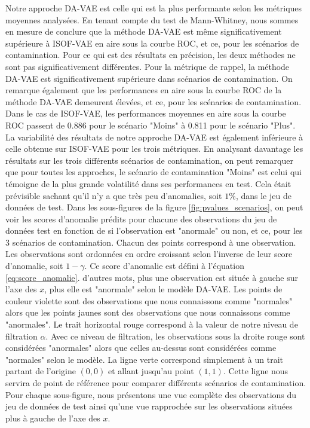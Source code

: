 Notre approche DA-VAE est celle qui est la plus performante selon les métriques moyennes analysées. En tenant compte du test de Mann-Whitney, nous sommes en mesure de conclure que la méthode DA-VAE est même significativement supérieure à ISOF-VAE en aire sous la courbe ROC, et ce, pour les \DIFdelbegin {}\DIFdelend \DIFaddbegin {}\DIFaddend scénarios de contamination. Pour ce qui est des résultats en précision, les deux méthodes ne sont pas significativement différentes. Pour la métrique de rappel, la méthode DA-VAE est significativement supérieure dans \DIFdelbegin {}\DIFdelend \DIFaddbegin {}\DIFaddend scénarios de contamination. On remarque également  que les performances en aire sous la courbe ROC de la méthode DA-VAE demeurent élevées, et ce, pour les \DIFdelbegin {}\DIFdelend \DIFaddbegin {}\DIFaddend scénarios de contamination. Dans le cas de ISOF-VAE, les performances moyennes en aire sous la courbe ROC passent de 0.886 pour le scénario "Moins" à 0.811 pour le scénario "Plus". La variabilité des résultats de notre approche DA-VAE est également inférieure à celle obtenue sur ISOF-VAE pour les trois métriques. En analysant davantage les résultats sur les trois différents scénarios de contamination, on peut remarquer que pour toutes les approches, le scénario de contamination "Moins" est celui qui témoigne de la plus grande volatilité dans ses performances en test. Cela était prévisible sachant qu'il n'y a que très peu d'anomalies, soit $1\%$, dans le jeu de données de test. Dans les \DIFdelbegin {}\DIFdelend \DIFaddbegin {}\DIFaddend sous-figures de la figure \ref{fig:pvalues_scenarios}, on peut voir les scores d'anomalie prédits pour chacune des observations du jeu de données test en fonction de si l'observation est "anormale" ou non, et ce, pour les 3 scénarios de contamination. Chacun des points correspond à une observation. Les observations sont ordonnées en ordre croissant selon l'inverse de leur score d'anomalie, soit $1-\gamma$. Ce score d'anomalie est défini à l'équation \ref{eq:score_anomalie}. \DIFdelbegin {}\DIFdelend \DIFaddbegin {}\DIFaddend d'autres mots, plus une observation est située à gauche sur l'axe des $x$, plus elle est "anormale" selon le modèle DA-VAE. Les points de couleur violette sont des observations que nous connaissons comme "normales" alors que les points jaunes sont des observations que nous connaissons comme "anormales". Le trait horizontal rouge correspond à la valeur de notre niveau de filtration $\alpha$. Avec ce niveau de filtration, les observations sous la droite rouge sont considérées "anormales" alors que celles au-dessus sont considérées comme "normales" selon le modèle. La ligne verte correspond simplement à un trait partant de l'origine $(0,0)$ et allant jusqu'au point $(1,1)$. Cette ligne nous servira de point de référence pour comparer différents scénarios de contamination. Pour chaque sous-figure, nous présentons une vue complète des observations du jeu de données de test ainsi qu'une vue rapprochée sur les observations situées plus à gauche de l'axe des $x$.

